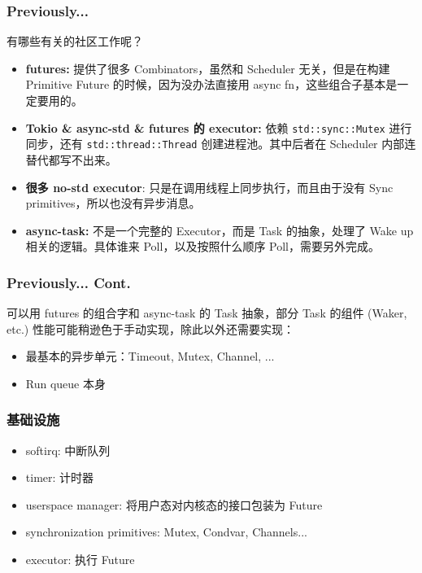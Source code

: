 \documentclass[UTF-8]{ctexbeamer}
\begin{document}
\begin{frame}
  \frametitle{Previously...}

  有哪些有关的社区工作呢？
  \pause
  \begin{itemize}
    \item \textbf{futures:} 提供了很多 Combinators，虽然和 Scheduler 无关，但是在构建 Primitive Future 的时候，因为没办法直接用 async fn，这些组合子基本是一定要用的。
          \pause
    \item \textbf{Tokio \& async-std \& futures 的 executor:} 依赖 \texttt{std::sync::Mutex} 进行同步，还有 \texttt{std::thread::Thread} 创建进程池。其中后者在 Scheduler 内部连替代都写不出来。
          \pause
    \item \textbf{很多 no-std executor}: 只是在调用线程上同步执行，而且由于没有 Sync primitives，所以也没有异步消息。
          \pause
    \item \textbf{async-task:} 不是一个完整的 Executor，而是 Task 的抽象，处理了 Wake up 相关的逻辑。具体谁来 Poll，以及按照什么顺序 Poll，需要另外完成。
  \end{itemize}

\end{frame}
\begin{frame}
  \frametitle{Previously... Cont.}
  可以用 futures 的组合字和 async-task 的 Task 抽象，部分 Task 的组件 (Waker, etc.) 性能可能稍逊色于手动实现，除此以外还需要实现：
  \begin{itemize}
    \item 最基本的异步单元：Timeout, Mutex, Channel, ...
    \item Run queue 本身
  \end{itemize}
\end{frame}

\begin{frame}[fragile]
  \frametitle{基础设施}

  \begin{itemize}
    \item softirq: 中断队列
    \item timer: 计时器
    \item userspace manager: 将用户态对内核态的接口包装为 Future
    \item synchronization primitives: Mutex, Condvar, Channels...
    \item executor: 执行 Future
  \end{itemize}

\end{frame}
\end{document}
